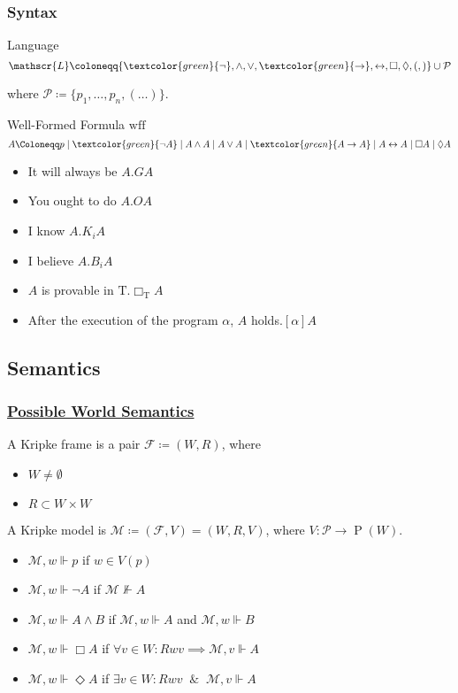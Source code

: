 \documentclass[UTF8,11pt,colorlinks,compress,openany]{beamer}%
\begin{document}
\begin{frame}\frametitle{Syntax}
\setlength\abovedisplayskip{0pt}
\setlength\belowdisplayskip{0pt}
	\begin{block}{Language}
		\[\mathscr{L}\coloneqq \{\textcolor{green}{\neg},\wedge,\vee,\textcolor{green}{\to},\leftrightarrow,\Box,\Diamond,(,)\}\cup\mathcal{P}\]
	\end{block}
	where $\mathcal{P}\coloneqq \{p_1,\dots,p_n,(\dots)\}$.
	\begin{block}{Well-Formed Formula $\mathrm{wff}$}
		\[A\Coloneqq p\mid \textcolor{green}{\neg A}\mid A\wedge A\mid A\vee A\mid \textcolor{green}{A\to A}\mid A\leftrightarrow A\mid \Box A\mid \Diamond A\]
	\end{block}
	\begin{itemize}
		\item It will always be $A$.\hfill $GA$
		\item You ought to do $A$.\hfill $O A$
		\item I know $A$.\hfill $K_i A$
		\item I believe $A$.\hfill $B_i A$
		\item $A$ is provable in $\mathrm{T}$.\hfill $\Box_\mathrm{T}A$
		\item After the execution of the program $\alpha$, $A$ holds.\hfill $[\alpha]A$
	\end{itemize}
\end{frame}

\subsection{Semantics}

\begin{frame}\frametitle{\href{http://rkirsling.github.io/modallogic/}{Possible World Semantics}}
	A Kripke frame is a pair $\mathcal{F}\coloneqq (W,R)$, where
	\begin{itemize}
		\item $W\neq\emptyset$
		\item $R\subset W\times W$
	\end{itemize}
	A Kripke model is $\mathcal{M}\coloneqq (\mathcal{F},V)=(W,R,V)$, where $V:\mathcal{P}\to \operatorname{P}(W)$.
	\begin{itemize}
		\item $\mathcal{M},w\Vdash p$ if $w\in V(p)$
		\item $\mathcal{M},w\Vdash\neg A$ if $\mathcal{M}\nVdash A$
		\item $\mathcal{M},w\Vdash A\wedge B$ if $\mathcal{M},w\Vdash A$ and $\mathcal{M},w\Vdash B$
		\item $\mathcal{M},w\Vdash\Box A$ if $\forall v\in W: Rwv\implies\mathcal{M},v\Vdash A$
		\item $\mathcal{M},w\Vdash\Diamond A$ if $\exists v\in W: Rwv\;\;\&\;\;\mathcal{M},v\Vdash A$
	\end{itemize}
\end{frame}
\end{document}
